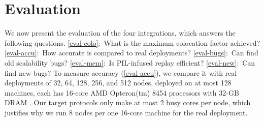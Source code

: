 

\section{Evaluation}
\label{sec-eval}






We now present the evaluation of the four \sck integrations, which answers
the following questions.
%
\sec\ref{eval-colo}:~What is the maximum colocation factor achieved?
%
\sec\ref{eval-accu}:~How accurate is \sck compared to real deployments?
%
\sec\ref{eval-bugs}:~Can \sck find old scalability bugs?
%
\sec\ref{eval-mem}:~Is PIL-infused replay efficient?
%
\sec\ref{eval-new}:~Can \sck find new bugs?
%
%
%
%
%
%
To measure \sck accuracy (\sec\ref{eval-accu}), we compare it with real
deployments of 32, 64, 128, 256, and 512 nodes, deployed on at most 128
machines, each has 16-core AMD Opteron(tm) 8454 processors with 32-GB DRAM
\cite{ProbeWeb}.
%
Our target protocols only make at most 2 busy cores per node, which
justifies why we run 8 nodes per one 16-core machine for the real
deployment.
%






